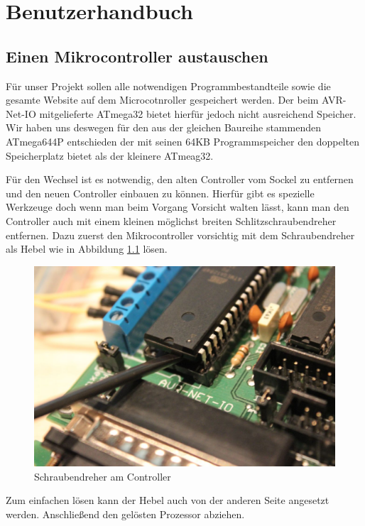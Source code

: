 \chapter{Benutzerhandbuch} 
\label{chap:Benutzerhandbuch}

\section{Einen Mikrocontroller austauschen}
Für unser Projekt sollen alle notwendigen Programmbestandteile sowie die gesamte
Website auf dem Microcotnroller gespeichert werden. Der beim AVR-Net-IO
mitgelieferte ATmega32 bietet hierfür jedoch nicht ausreichend Speicher.
Wir haben uns deswegen für den aus der gleichen Baureihe stammenden ATmega644P
entschieden der mit seinen 64KB Programmspeicher den doppelten Speicherplatz
bietet als der kleinere ATmeag32.

Für den Wechsel ist es notwendig, den alten Controller vom Sockel zu entfernen
und den neuen Controller einbauen zu können. Hierfür gibt es spezielle
Werkzeuge doch wenn man beim Vorgang Vorsicht walten lässt, kann man den
Controller auch mit einem kleinen möglichst breiten Schlitzschraubendreher
entfernen. Dazu zuerst den Mikrocontroller vorsichtig mit dem Schraubendreher
als Hebel wie in Abbildung \ref{ausbau1} lösen.

\begin{figure}[H]
\centering
\includegraphics[width=13cm]{content/pictures/Anleitung/tauscheProzessor/1_Hebel.jpg}
\caption{Schraubendreher am Controller}
\label{ausbau1}
\end{figure}

Zum einfachen lösen kann der Hebel auch von der anderen Seite angesetzt
werden. Anschließend den gelösten Prozessor abziehen.

